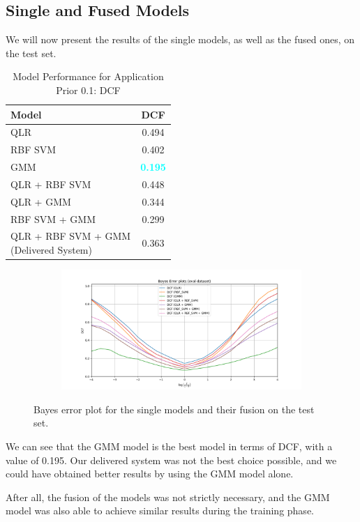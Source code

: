 \documentclass[12pt]{report}
\newcommand{\nl}{%
    \newline
    \noindent
}
\begin{document}
\subsection*{Single and Fused Models}
We will now present the results of the single models, as well as the fused ones, on the test set.
\nl
\begin{table}[H]
    \centering
    \begin{tabular}{|l|c|}
        \hline
        \rowcolor{blue!10}
        \textbf{Model} & \textbf{DCF}                     \\
        \hline
        QLR            & 0.494                            \\
        \hline
        RBF SVM        & 0.402                            \\
        \hline
        GMM            & \textcolor{cyan}{\textbf{0.195}} \\
        \hline
        QLR + RBF SVM  & 0.448                            \\
        \hline
        QLR + GMM      & 0.344                            \\
        \hline
        RBF SVM + GMM  & 0.299                            \\
        \hline
        \makecell{QLR + RBF SVM + GMM                     \\ (Delivered System)} & 0.363                            \\
        \hline
    \end{tabular}
    \caption{Model Performance for Application Prior 0.1: DCF}
    \label{tab:model_performance}
\end{table}

\begin{figure}[H]
    \centering
    \begin{subfigure}[t]{0.6\textwidth}
        \includegraphics[width=\textwidth]{./plot/eval/DCF_eval.png}
    \end{subfigure}
    \caption{Bayes error plot for the single models and their fusion on the test set.}
    \label{fig:DCF_eval}
\end{figure}
\noindent
We can see that the GMM model is the best model in terms of DCF, with a value of 0.195. Our delivered system was not the best choice possible, and we could have obtained better results by using the GMM model alone.
\nl
After all, the fusion of the models was not strictly necessary, and the GMM model was also able to achieve similar results during the training phase.
\end{document}

